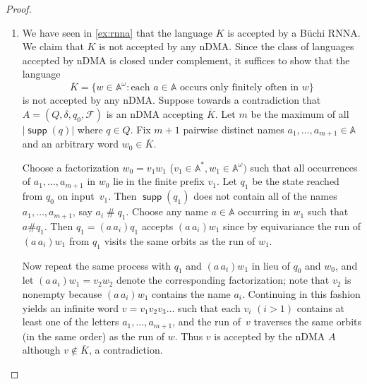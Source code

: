 \documentclass[final,a4paper,UKenglish,thm-restate,autoref,numberwithinsect]{lipics-v2021}
\newcommand{\compr}{:}
\newcommand{\F}{\mathcal{F}}
\numberwithin{equation}{section}
\newcommand{\ol}{\overline}
\newcommand{\+}[1]{\mathcal{#1}\xspace}
\newcommand{\names}{\mathbb{A}}
\DeclareMathOperator{\supp}{\mathsf{supp}} %
\newcommand{\fresh}{\mathbin{\#}}
\theoremstyle{definition}
\begin{document}
\begin{proof}
  \begin{enumerate}
  \item We have seen in \autoref{ex:rnna} that the language $K$ is
    accepted by a Büchi RNNA. We claim that $K$ is not accepted by any
    nDMA. Since the class of languages accepted by nDMA is closed
    under complement, it suffices to show that the
    language
    \[\ol{K}=\{ w\in \names^\omega\compr \text{each $a\in \names$ occurs
        only finitely often in $w$} \}\] is not accepted by any
    nDMA. Suppose towards a contradiction that $A=(Q,\delta,q_0,\F)$ is an
    nDMA accepting $\ol{K}$. Let $m$ be the maximum of all
    $|\supp(q)|$ where $q\in Q$.  Fix $m+1$ pairwise distinct names
    $a_1,\ldots, a_{m+1}\in \names$ and an arbitrary word
    $w_0\in \ol{K}$.

    Choose a factorization $w_0=v_1w_1$
    ($v_1\in \names^*, w_1\in \names^\omega)$ such that all
    occurrences of $a_1,\ldots, a_{m+1}$ in $w_0$ lie in the finite
    prefix $v_1$. Let $q_1$ be the state reached from $q_0$ on
    input~$v_1$.  Then $\supp(q_1)$ does not contain all of the names
    $a_1,\ldots, a_{m+1}$, say $a_i\fresh q_1$. Choose any name
    $a\in \names$ occurring in $w_1$ such that $a\# q_1$. Then
    $q_1=(a\, a_i)q_1$ accepts $(a\, a_i)w_1$ since by
    equivariance the run of $(a\, a_i)w_1$ from $q_1$ visits the
    same orbits as the run of $w_1$.

    Now repeat the same process with $q_1$ and $(a\,a_i)w_1$ in lieu
    of $q_0$ and $w_0$, and let \mbox{$(a\, a_i)w_1 = v_2w_2$} denote the
    corresponding factorization; note that $v_2$ is nonempty because
    $(a\,a_i)w_1$ contains the name $a_i$. Continuing in this fashion
    yields an infinite word $v=v_1v_2v_3\ldots$ such that each $v_i$
    $(i>1)$ contains at least one of the letters
    $a_1,\ldots, a_{m+1}$, and the run of~$v$ traverses the same
    orbits (in the same order) as the run of $w$. Thus $v$ is accepted
    by the nDMA $A$ although $v\not\in \ol{K}$, a contradiction.
    

\end{enumerate}
\end{proof}
\end{document}
